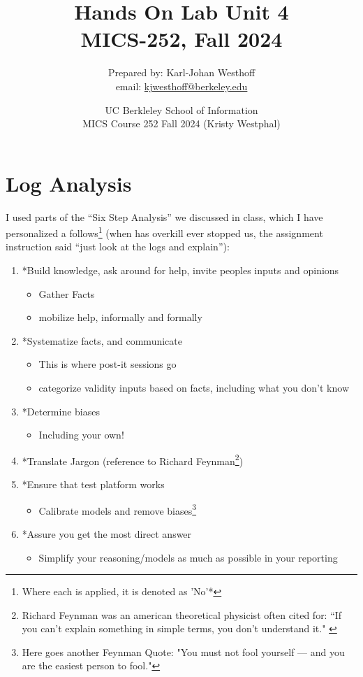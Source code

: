 \documentclass[
	letterpaper, %
	10pt, %
	unnumberedsections, %
	twoside, %
]{APAAssignment}
\title{Hands On Lab Unit 4 \\ MICS-252, Fall 2024} %
\date{UC Berkleley School of Information \\
MICS Course 252 Fall 2024 (Kristy Westphal)
}
\author{
	Prepared by: Karl-Johan Westhoff \\
	email: \href{mailto:kjwesthoff@berkeley.edu}{kjwesthoff@berkeley.edu}
}
\begin{document}
\onecolumn
\maketitle %



\section{Log Analysis}\label{log-analysis}

I used parts of the ``Six Step Analysis'' we discussed in class, which I have personalized a follows\footnote{Where each is applied, it is denoted as 'No'*} (when has overkill ever stopped us, the assignment instruction said ``just look at the logs and explain''):
\begin{enumerate}
  \item *Build knowledge, ask around for help, invite peoples inputs and opinions
  	\begin{itemize} 
		\item Gather Facts
		\item mobilize help, informally and formally
	\end{itemize} 
  \item *Systematize facts, and communicate
   	\begin{itemize} 
		\item This is where post-it sessions go
		\item categorize validity inputs based on facts, including what you don't know
   	\end{itemize}  
  \item *Determine biases
   	\begin{itemize}
		\item Including your own! 
  	\end{itemize}   
  \item *Translate Jargon (reference to Richard Feynman\footnote{Richard Feynman was an american theoretical physicist often cited for: “If you can't explain something in simple terms, you don't understand it."\cite{FeynmanMedium} \cite{FeynmanWikipedia}})
  \item *Ensure that test platform works 
   	\begin{itemize}
  		\item Calibrate models and remove biases\footnote{Here goes another Feynman Quote: "You must not fool yourself — and you are the easiest person to fool."\cite{FeynmanFoolOurselves}}
    \end{itemize}
  \item *Assure you get the most direct answer
  	\begin{itemize}
  		\item Simplify your reasoning/models as much as possible in your reporting
  	\end{itemize}
\end{enumerate}
\end{document}
